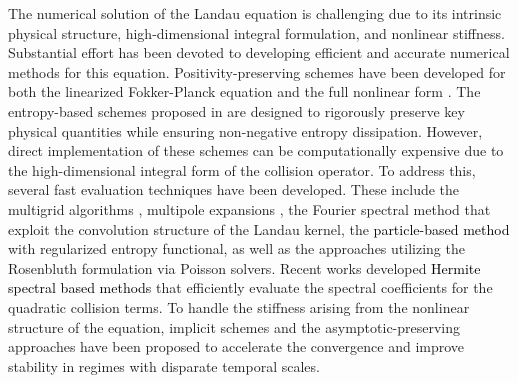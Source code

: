 \documentclass[preprint,1p,times]{elsarticle}
\theoremstyle{definition}
\theoremstyle{remark}
\newcommand{\tcr}[1]{\textcolor{black}{#1}}
\begin{document}
The numerical solution of the Landau equation is challenging due to its intrinsic physical structure, high-dimensional integral formulation, and nonlinear stiffness. Substantial effort has been devoted to developing efficient and accurate numerical methods for this equation. Positivity-preserving schemes have been developed for both the linearized Fokker-Planck equation \cite{chang1970practical} and the full nonlinear form \cite{larsen1985discretization}. The entropy-based schemes proposed in \cite{buet1999numerical,degond1994entropy} are designed to rigorously preserve key physical quantities while ensuring non-negative entropy dissipation. 
However, direct implementation of these schemes can be computationally expensive due to the high-dimensional integral form of the collision operator. To address this, several fast evaluation techniques have been developed. These include the multigrid algorithms \cite{buet1997fast}, multipole expansions \cite{lemou1998multipole}, the Fourier spectral method \cite{pareschi2000fast,filbet2002numerical,zhang2017conservative} that exploit the convolution structure of the Landau kernel, the \tcr{particle-based method \cite{Carrillo_JCP_2020, carrillo2021random, bailo2024collisional}} with regularized entropy functional, as well as the approaches \cite{chacon2000implicit,taitano2016adaptive} utilizing the Rosenbluth formulation \cite{Rosenbluth_PR_1957} via Poisson solvers. 
Recent works developed \tcr{Hermite spectral based methods \cite{wang2019approximation,li2020approximation,li2021hermite}} that efficiently evaluate the spectral coefficients for the quadratic collision terms. To handle the stiffness arising from the nonlinear structure of the equation, implicit schemes \cite{epperlein1994implicit,chacon2000implicit,lemou2005implicit,taitano2016adaptive} and the asymptotic-preserving approaches \cite{filbet2010class,jin2011class} have been proposed to accelerate the convergence and improve stability in regimes with disparate temporal scales.
\end{document}
